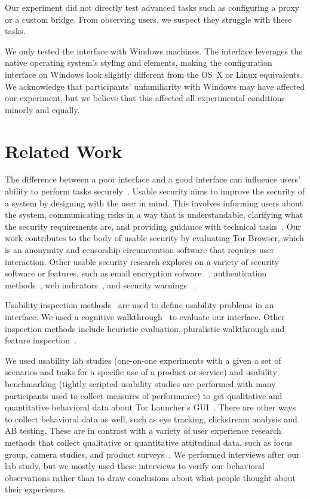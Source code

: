 \documentclass[USenglish,oneside,twocolumn]{article}
\begin{document}
Our experiment did not directly test advanced tasks such as configuring a proxy or a custom bridge. From observing  users, we suspect they struggle with these tasks. 

We only tested the interface with Windows machines.
The interface leverages the native operating system's styling and elements, making the configuration interface on Windows look slightly different from the OS~X or Linux equivalents. We acknowledge that participants' unfamiliarity with Windows may have affected our experiment, but we believe that this affected all experimental conditions minorly and equally.  

\section{Related Work}
\label{sec:related} 
The difference between a poor interface and a good interface can influence users’ ability to perform tasks securely~\cite{payne2008brief}. Usable security aims to improve the security of a system by designing with the user in mind. This involves informing users about the system, communicating risks in a way that is understandable, clarifying what the security requirements are, and providing guidance with technical tasks~\cite{adams1999users}. Our work contributes to the body of usable security by evaluating Tor Browser, which is an anonymity and censorship circumvention software that requires user interaction. Other usable security research explores on a variety of security software or features, such as email encryption sofware ~\cite{whitten1999johnny}\cite{garfinkel2005johnny}, authentication methods~\cite{morris1979password}\cite{dhamija2000deja}\cite{suo2005graphical}, web indicators~\cite{dhamija2006phishing}\cite{akhawe2013alice}, and security warnings ~\cite{schechter2007emperor}\cite{egelman2008you}. 

Usability inspection methods~\cite{nielsen1994usability} are used to define usability problems in an interface. We
used a cognitive walkthrough~\cite{wharton1994cognitive}\cite{cognitive-walkthrough} to evaluate our interface. Other inspection methods include heuristic evaluation, pluralistic walkthrough and feature inspection~\cite{inspection}.  

We used usability lab studies (one-on-one experiments with a given a set of scenarios and tasks for a specific use of  a product or service) and usability benchmarking (tightly scripted usability studies are performed with many participants used to collect measures of performance) to get qualitative and quantitative behavioral data about Tor Launcher's GUI~\cite{krol2016towards}. There are other ways to collect behavioral data as well, such as eye tracking, clickstream analysis and AB testing. These are in contrast with a variety of user experience research methods that collect qualitative or quantitative attitudinal data, such as focus group, camera studies, and product surveys~\cite{ux-methods}. We performed interviews after our lab study, but we mostly used these interviews to verify our behavioral observations rather than to draw conclusions about what people thought about their experience. 
 
\end{document}
